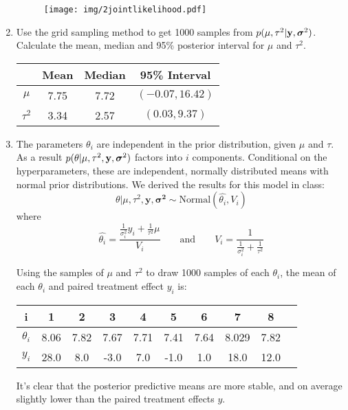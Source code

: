 \documentclass[12pt]{article}
\def\y{\mathbf{y}}
\newcommand{\si}{\mbox{\boldmath $\sigma$}}
\begin{document}
\begin{enumerate}
	\begin{figure}[h]
		\centering
			\texttt{[image: img/2jointlikelihood.pdf]}
	\end{figure}
	
	
	\item Use the grid sampling method to get 1000 samples from $p(\mu,\tau^2|\y,\si^2)$. Calculate the mean, median and 95\% posterior interval for $\mu$ and $\tau^2$.
	\begin{center}
		\begin{tabular}{c|ccc}
		         & Mean & Median &  95\% Interval  \\
		\hline
		$\mu$    & 7.75 & 7.72 & $(-0.07, 16.42)$\\
		$\tau^2$ & 3.34 & 2.57 & $(0.03, 9.37)$\\
		\end{tabular}	
	\end{center}
	
	\item The parameters $\theta_i$ are independent in the prior distribution, given $\mu$ and $\tau$. As a result $p(\mathbf{\theta}|\mu,\tau^2,\y,\si^2)$ factors into $i$ components. Conditional on the hyperparameters, these are independent, normally distributed means with normal prior distributions.  We derived the results for this model in class: \[
		\theta \vert \mu, \tau^2, \mathbf{y}, \mathbf{\sigma^2} \sim \mbox{Normal}(\hat{\theta_i}, V_i)
	\]
	where\[
		\hat{\theta_i} = \dfrac{\frac{1}{\sigma^2_i}y_i + \frac{1}{\tau^2}\mu}{V_i} \qquad \mathrm{ and } \qquad V_i=\dfrac{1}{\frac{1}{\sigma^2_i} + \frac{1}{\tau^2}}
	\]
	
	 Using the samples of $\mu$ and $\tau^2$ to draw 1000 samples of each $\theta_i$, the mean of each $\theta_i$ and paired treatment effect $y_i$ is:
\begin{center}
	\begin{tabular}{c|ccccccccc}
		i & 1 & 2 & 3 & 4 & 5 & 6 & 7 & 8 \\
		\hline
		$\theta_i$ & 8.06 & 7.82 & 7.67 & 7.71 &  7.41 & 7.64 &  8.029 & 7.82 \\
		$y_i$ &  28.0 &   8.0 &  -3.0 &   7.0 &  -1.0 &   1.0 &  18.0 &  12.0 \\
	\end{tabular}
\end{center}
It's clear that the posterior predictive means are more stable, and on average slightly lower than the paired treatment effects $y$.


\end{enumerate}
\end{document}

